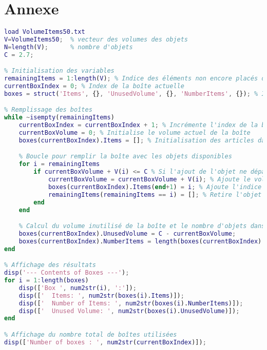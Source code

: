 \section{Annexe}
\begin{lstlisting}[language=Matlab, caption={Code MATLAB pour le remplissage de boîtes}]
% Volume des objets et capacité de la boîte
load VolumeItems50.txt
V=VolumeItems50;  % vecteur des volumes des objets
N=length(V);      % nombre d'objets
C = 2.7;   

% Initialisation des variables
remainingItems = 1:length(V); % Indice des éléments non encore placés dans une boîte
currentBoxIndex = 0; % Index de la boîte actuelle
boxes = struct('Items', {}, 'UnusedVolume', {}, 'NumberItems', {}); % Initialisation de la structure de boîtes

% Remplissage des boîtes
while ~isempty(remainingItems)
    currentBoxIndex = currentBoxIndex + 1; % Incrémente l'index de la boîte
    currentBoxVolume = 0; % Initialise le volume actuel de la boîte
    boxes(currentBoxIndex).Items = []; % Initialisation des articles dans la boîte

    % Boucle pour remplir la boîte avec les objets disponibles
    for i = remainingItems
        if currentBoxVolume + V(i) <= C % Si l'ajout de l'objet ne dépasse pas la capacité
            currentBoxVolume = currentBoxVolume + V(i); % Ajoute le volume de l'objet à la boîte
            boxes(currentBoxIndex).Items(end+1) = i; % Ajoute l'indice de l'objet à la boîte
            remainingItems(remainingItems == i) = []; % Retire l'objet de la liste des éléments disponibles
        end
    end

    % Calcul du volume inutilisé de la boîte et le nombre d'objets dans la boîte
    boxes(currentBoxIndex).UnusedVolume = C - currentBoxVolume;
    boxes(currentBoxIndex).NumberItems = length(boxes(currentBoxIndex).Items);
end

% Affichage des résultats
disp('--- Contents of Boxes ---');
for i = 1:length(boxes)
    disp(['Box ', num2str(i), ':']);
    disp(['  Items: ', num2str(boxes(i).Items)]);
    disp(['  Number of Items: ', num2str(boxes(i).NumberItems)]);
    disp(['  Unused Volume: ', num2str(boxes(i).UnusedVolume)]);
end

% Affichage du nombre total de boîtes utilisées
disp(['Number of boxes : ', num2str(currentBoxIndex)]);
\end{lstlisting}


